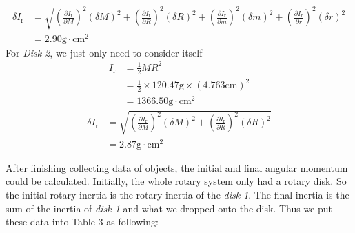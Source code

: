 \begin{equation*}
  \begin{aligned}
    \delta I_{\text{r}} & =\sqrt{(\frac{\partial I_{\text{r}}}{\partial M})^2(\delta M)^2+(\frac{\partial I_{\text{r}}}{\partial R})^2(\delta R)^2+(\frac{\partial I_{\text{r}}}{\partial m})^2(\delta m)^2+(\frac{\partial I_{\text{r}}}{\partial r})^2(\delta r)^2} \\
                        & =2.90\text{g}\cdot\text{cm}^2
  \end{aligned}
\end{equation*}
For \emph{Disk 2}, we just only need to consider itself
\begin{equation*}
  \begin{aligned}
    I_{\text{r}} & =\frac{1}{2}MR^2                                         \\
                 & =\frac{1}{2}\times120.47\text{g}\times(4.763\text{cm})^2 \\
                 & =1366.50\text{g}\cdot\text{cm}^2
  \end{aligned}
\end{equation*}
\begin{equation*}
  \begin{aligned}
    \delta I_{\text{r}} & =\sqrt{(\frac{\partial I_{\text{r}}}{\partial M})^2(\delta M)^2+(\frac{\partial I_{\text{r}}}{\partial R})^2(\delta R)^2} \\
                        & =2.87\text{g}\cdot\text{cm}^2
  \end{aligned}
\end{equation*}
\par
After finishing collecting data of objects, the initial and final angular momentum could be calculated. Initially, the whole rotary system only had a rotary disk. So the initial rotary inertia is the rotary inertia of the \emph{disk 1}. The final inertia is the sum of the inertia of \emph{disk 1} and what we dropped onto the disk. Thus we put these data into Table 3 as following:
